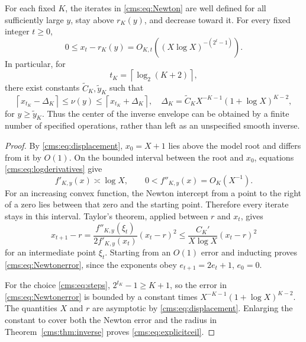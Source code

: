 \begin{theorem}\label{cms:thm:Newton}
For each fixed $K$, the iterates in \eqref{cms:eq:Newton} are well defined for all sufficiently large $y$, stay above $r_K(y)$, and decrease toward it. For every fixed integer $t\geq0$,
\begin{equation}\label{cms:eq:Newtonerror}
0\leq x_t-r_K(y)
=O_{K,t}\!\left((X\log X)^{-(2^t-1)}\right).
\end{equation}
In particular, for
\begin{equation}\label{cms:eq:steps}
t_K=\left\lceil\log_2(K+2)\right\rceil,
\end{equation}
there exist constants $\widetilde C_K,\widetilde y_K$ such that
\begin{equation}\label{cms:eq:explicitceil}
\left\lceil x_{t_K}-\Delta_K\right\rceil
\leq\nu(y)\leq
\left\lceil x_{t_K}+\Delta_K\right\rceil,
\quad
\Delta_K=\widetilde C_KX^{-K-1}(1+\log X)^{K-2},
\end{equation}
for $y\geq\widetilde y_K$. Thus the center of the inverse envelope can be obtained by a finite number of specified operations, rather than left as an unspecified smooth inverse.
\end{theorem}
\begin{proof}
By \eqref{cms:eq:displacement}, $x_0=X+1$ lies above the model root and differs from it by $O(1)$. On the bounded interval between the root and $x_0$, equations \eqref{cms:eq:logderivatives} give
\[
f'_{K,y}(x)\asymp\log X,\qquad
0<f''_{K,y}(x)=O_K(X^{-1}).
\]
For an increasing convex function, the Newton intercept from a point to the right of a zero lies between that zero and the starting point. Therefore every iterate stays in this interval. Taylor's theorem, applied between $r$ and $x_t$, gives
\begin{equation}\label{cms:eq:quadratic}
x_{t+1}-r
=\frac{f''_{K,y}(\xi_t)}{2f'_{K,y}(x_t)}(x_t-r)^2
\leq\frac{C_K'}{X\log X}(x_t-r)^2
\end{equation}
for an intermediate point $\xi_t$. Starting from an $O(1)$ error and inducting proves \eqref{cms:eq:Newtonerror}, since the exponents obey $e_{t+1}=2e_t+1$, $e_0=0$.

For the choice \eqref{cms:eq:steps}, $2^{t_K}-1\geq K+1$, so the error in \eqref{cms:eq:Newtonerror} is bounded by a constant times $X^{-K-1}(1+\log X)^{K-2}$. The quantities $X$ and $r$ are asymptotic by \eqref{cms:eq:displacement}. Enlarging the constant to cover both the Newton error and the radius in Theorem~\ref{cms:thm:inverse} proves \eqref{cms:eq:explicitceil}.
\end{proof}

